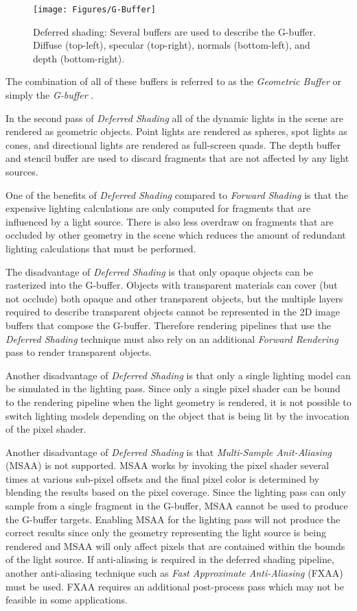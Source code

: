 \begin{figure}[h]
\centering
\texttt{[image: Figures/G-Buffer]}
\decoRule
\caption[G-Buffer]{Deferred shading: Several buffers are used to describe the G-buffer. Diffuse (top-left), specular (top-right), normals (bottom-left), and depth (bottom-right).}
\label{fig:G-Buffer}
\end{figure}

The combination of all of these buffers is referred to as the \emph{Geometric Buffer} or simply the \emph{G-buffer} \parencite{12_saitotakahashi_1990}.

In the second pass of \emph{Deferred Shading} all of the dynamic lights in the scene are rendered as geometric objects. Point lights are rendered as spheres, spot lights as cones, and directional lights are rendered as full-screen quads. The depth buffer and stencil buffer are used to discard fragments that are not affected by any light sources.

One of the benefits of \emph{Deferred Shading} compared to \emph{Forward Shading} is that the expensive lighting calculations are only computed for fragments that are influenced by a light source. There is also less overdraw on fragments that are occluded by other geometry in the scene which reduces the amount of redundant lighting calculations that must be performed.

The disadvantage of \emph{Deferred Shading} is that only opaque objects can be rasterized into the G-buffer. Objects with transparent materials can cover (but not occlude) both opaque and other transparent objects, but the multiple layers required to describe transparent objects cannot be represented in the 2D image buffers that compose the G-buffer. Therefore rendering pipelines that use the \emph{Deferred Shading} technique must also rely on an additional \emph{Forward Rendering} pass to render transparent objects.

Another disadvantage of \emph{Deferred Shading} is that only a single lighting model can be simulated in the lighting pass. Since only a single pixel shader can be bound to the rendering pipeline when the light geometry is rendered, it is not possible to switch lighting models depending on the object that is being lit by the invocation of the pixel shader.

Another disadvantage of \emph{Deferred Shading} is that \emph{Multi-Sample Anit-Aliasing} (MSAA) \parencite{47_Microsoft_2017} is not supported. MSAA works by invoking the pixel shader several times at various sub-pixel offsets and the final pixel color is determined by blending the results based on the pixel coverage. Since the lighting pass can only sample from a single fragment in the G-buffer, MSAA cannot be used to produce the G-buffer targets. Enabling MSAA for the lighting pass will not produce the correct results since only the geometry representing the light source is being rendered and MSAA will only affect pixels that are contained within the bounds of the light source. If anti-aliasing is required in the deferred shading pipeline, another anti-aliasing technique such as \emph{Fast Approximate Anti-Aliasing} (FXAA) \parencite{lottes_2009} must be used. FXAA requires an additional post-process pass which may not be feasible in some applications. 

